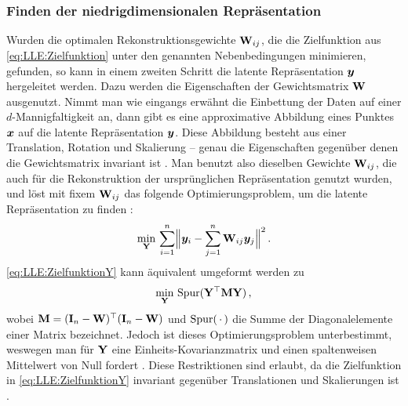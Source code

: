 \subsubsection{Finden der niedrigdimensionalen Repräsentation}
\label{ch:MethodenDerDimRed:statistisch:LLE:FindenDerRepr}
Wurden die optimalen Rekonstruktionsgewichte $\mathbf{W}_{ij}$, die die Zielfunktion aus
\eqref{eq:LLE:Zielfunktion} unter den genannten Nebenbedingungen minimieren, gefunden, so kann in einem zweiten Schritt die latente Repräsentation $\bm{y}$ hergeleitet werden. Dazu werden die Eigenschaften der Gewichtsmatrix $\mathbf{W}$ ausgenutzt. Nimmt man wie eingangs erwähnt die Einbettung der Daten auf einer $d$-Mannigfaltigkeit an, dann gibt es eine approximative Abbildung eines Punktes $\bm{x}$ auf die latente Repräsentation $\bm{y}$. Diese Abbildung besteht aus einer Translation, Rotation und Skalierung -- genau die Eigenschaften gegenüber denen die Gewichtsmatrix invariant ist \parencite[2324]{Roweis.2000}. Man benutzt also dieselben Gewichte $\mathbf{W}_{ij}$, die auch für die
Rekonstruktion der ursprünglichen Repräsentation genutzt wurden, und löst mit fixem $\mathbf{W}_{ij}$
das folgende Optimierungsproblem, um die latente Repräsentation zu finden \parencite[2324]{Roweis.2000}:
\begin{equation}
	\label{eq:LLE:ZielfunktionY}
	\min_{\mat{Y}}\, \sum_{i = 1}^n \norm[\Big]{\vect{y}_i - \sum_{j = 1}^n \mat{W}_{ij}\vect{y}_j}^2 \, .
\end{equation}
\eqref{eq:LLE:ZielfunktionY} kann äquivalent umgeformt werden zu \parencite[4]{Ghojogh.2020}
\begin{equation}
	\min_{\mathbf{Y}}\, \operatorname{Spur}(\mathbf{Y}^\top \mathbf{M} \mathbf{Y}) \, ,
\end{equation}
wobei $\mathbf{M} = (\mathbf{I}_n - \mathbf{W})^\top (\mathbf{I}_n - \mathbf{W})$ und $\operatorname{Spur}(\,\cdot\,)$ die Summe der Diagonalelemente einer Matrix bezeichnet. Jedoch ist dieses Optimierungsproblem unterbestimmt, weswegen man für $\mathbf{Y}$ eine Einheits-Kovarianzmatrix und einen spaltenweisen Mittelwert von Null fordert \parencite[11]{Saul.2000}. Diese Restriktionen sind erlaubt, da die Zielfunktion in
\eqref{eq:LLE:ZielfunktionY} invariant gegenüber Translationen und Skalierungen ist \parencite[2326]{Roweis.2000}.

